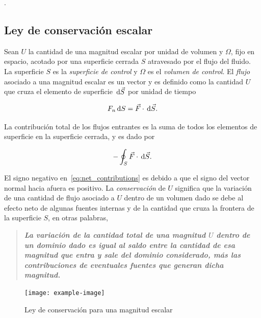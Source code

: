 \begin{theorem}
    .
\end{theorem}

\subsection{Ley de conservación escalar}

Sean $U$ la cantidad de una magnitud escalar por unidad de volumen y
$\Omega$, fijo en espacio, acotado por una superficie cerrada $S$
atravesado por el flujo del fluido.
La superficie $S$ es la \emph{superficie de control} y $\Omega$ es el
\emph{volumen de control}.
El \emph{flujo} asociado a una magnitud escalar es un vector y es
definido como la cantidad $U$ que cruza el elemento de superficie
$\dl{\vec{S}}$ por unidad de tiempo

\begin{equation*}
    F_{n}\dl S=
    \vec{F}\cdot
    \dl{\vec{S}}.
\end{equation*}

La contribución total de los flujos entrantes es la suma de todos los
elementos de superficie en la superficie cerrada, y es dado por

\begin{equation}
    -\oint_{S}
    \vec{F}\cdot
    \dl{\vec{S}}.\label{eq:net_contributions}
\end{equation}

El signo negativo en~\eqref{eq:net_contributions} es debido a que el
signo del vector normal hacia afuera es positivo.
La \emph{conservación} de $U$ significa que la variación de una
cantidad de flujo asociado a $U$ dentro de un volumen dado se debe al
efecto neto de algunas fuentes internas y de la cantidad que cruza la
frontera de la superficie $S$, en otras palabras,

\begin{quotation}
    \bfseries\itshape\color{DarkBlue}
    La variación de la cantidad total de una magnitud $U$ dentro
    de un dominio dado es igual al saldo entre la cantidad de esa
    magnitud que entra y sale del dominio considerado, más las
    contribuciones de eventuales fuentes que generan dicha magnitud.
\end{quotation}

\begin{figure}[ht!]
    \centering
    \texttt{[image: example-image]}
    \caption[short]{Ley de conservación para una magnitud escalar}
\end{figure}

